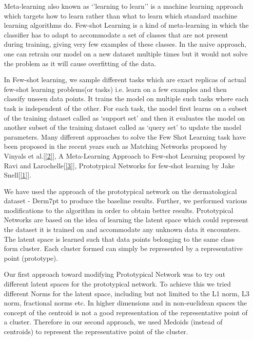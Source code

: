 Meta-learning also known as ‘’learning to learn’’ is a machine learning approach which targets how to learn rather than what to learn which standard machine learning algorithms do. Few-shot Learning is a kind of meta-learning in which the classifier has to adapt to accommodate a set of classes that are not present during training, giving very few examples of these classes.
In the naive approach, one can retrain our model on a new dataset multiple times but it would not solve the problem as it will cause overfitting of the data.

In Few-shot learning, we sample different tasks which are exact replicas of actual few-shot learning problems(or tasks) i.e. learn on a few examples and then classify unseen data points. It trains the model on multiple such tasks where each task is independent of the other. For each task, the model first learns on a subset of the training dataset called as ‘support set’ and then it evaluates the model on another subset of the training dataset called as ‘query set’ to update the model parameters. Many different approaches to solve the Few Shot Learning task have been proposed in the recent years such as Matching Networks proposed by Vinyals et al.[\ref{2}], A Meta-Learning Approach to Few-shot Learning proposed by Ravi and Larochelle[\ref{3}], Prototypical Networks for few-shot learning by Jake Snell[\ref{1}].

We have used the approach of the prototypical network on the dermatological dataset - Derm7pt to produce the baseline results. Further, we performed various modifications to the algorithm in order to obtain better results. Prototypical Networks are based on the idea of learning the latent space which could represent the dataset it is trained on and accommodate any unknown data it encounters. The latent space is learned such that data points belonging to the same class form cluster. Each cluster formed can simply be represented by a representative point (prototype). 

Our first approach toward modifying Prototypical Network was to try out different latent spaces for the prototypical network. To achieve this we tried different Norms for the latent space, including but not limited to the L1 norm, L3 norm, fractional norms etc. In higher dimensions and in non-euclidean spaces the concept of the centroid is not a good representation of the representative point of a cluster. Therefore in our second approach, we used Medoids (instead of centroids) to represent the representative point of the cluster.

